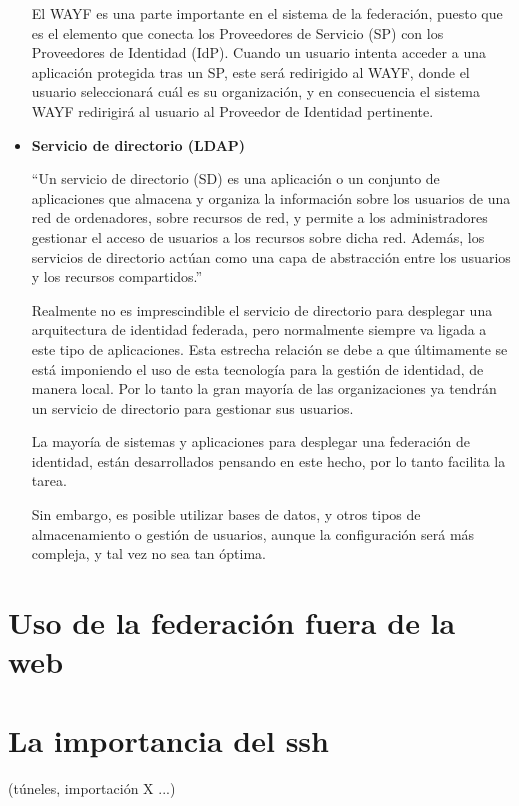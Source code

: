 \begin{itemize}
    El WAYF es una parte importante en el sistema de la federación,
    puesto que es el elemento que conecta los Proveedores de
    Servicio (SP) con los Proveedores de Identidad (IdP). Cuando un
    usuario intenta acceder a una aplicación protegida tras un SP,
    este será redirigido al WAYF, donde el usuario seleccionará cuál
    es su organización, y en consecuencia el sistema WAYF redirigirá
    al usuario al Proveedor de Identidad pertinente.

            \item \textbf{Servicio de directorio (LDAP)}

    ``Un servicio de directorio (SD) es una aplicación o un conjunto
    de aplicaciones que almacena y organiza la información sobre los
    usuarios de una red de ordenadores, sobre recursos de red, y
    permite a los administradores gestionar el acceso de usuarios a
    los recursos sobre dicha red. Además, los servicios de directorio
    actúan como una capa de abstracción entre los usuarios y los
    recursos compartidos.''

    Realmente no es imprescindible el servicio de directorio para
    desplegar una arquitectura de identidad federada, pero normalmente
    siempre va ligada a este tipo de aplicaciones. Esta estrecha
    relación se debe a que últimamente se está imponiendo el uso de
    esta tecnología para la gestión de identidad, de manera local. Por
    lo tanto la gran mayoría de las organizaciones ya tendrán un
    servicio de directorio para gestionar sus usuarios.

    La mayoría de sistemas y aplicaciones para desplegar una
    federación de identidad, están desarrollados pensando en este
    hecho, por lo tanto facilita la tarea.

    Sin embargo, es posible utilizar bases de datos, y otros tipos de
    almacenamiento o gestión de usuarios, aunque la configuración será
    más compleja, y tal vez no sea tan óptima.


            \end{itemize}


    \section{Uso de la federación fuera de la web}

    \section{La importancia del ssh}
         (túneles, importación X ...)
